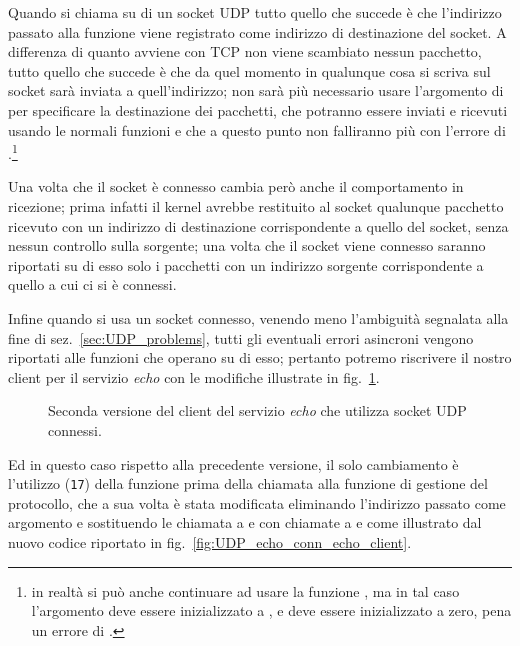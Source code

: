 Quando si chiama  su di un socket UDP tutto quello che succede è
che l'indirizzo passato alla funzione viene registrato come indirizzo di
destinazione del socket. A differenza di quanto avviene con TCP non viene
scambiato nessun pacchetto, tutto quello che succede è che da quel momento in
qualunque cosa si scriva sul socket sarà inviata a quell'indirizzo; non sarà
più necessario usare l'argomento  di  per specificare
la destinazione dei pacchetti, che potranno essere inviati e ricevuti usando
le normali funzioni  e  che a questo punto non
falliranno più con l'errore di .\footnote{in realtà si
  può anche continuare ad usare la funzione , ma in tal caso
  l'argomento  deve essere inizializzato a , e
   deve essere inizializzato a zero, pena un errore di
  .}

Una volta che il socket è connesso cambia però anche il comportamento in
ricezione; prima infatti il kernel avrebbe restituito al socket qualunque
pacchetto ricevuto con un indirizzo di destinazione corrispondente a quello
del socket, senza nessun controllo sulla sorgente; una volta che il socket
viene connesso saranno riportati su di esso solo i pacchetti con un indirizzo
sorgente corrispondente a quello a cui ci si è connessi.

Infine quando si usa un socket connesso, venendo meno l'ambiguità segnalata
alla fine di sez.~\ref{sec:UDP_problems}, tutti gli eventuali errori asincroni
vengono riportati alle funzioni che operano su di esso; pertanto potremo
riscrivere il nostro client per il servizio \textit{echo} con le modifiche
illustrate in fig.~\ref{fig:UDP_echo_conn_cli}.

\begin{figure}[!htbp] 
  \footnotesize \centering
  \begin{minipage}[c]{\codesamplewidth}
  \end{minipage}
  \normalsize
  \caption{Seconda versione del client del servizio \textit{echo} che utilizza
    socket UDP connessi.}
  \label{fig:UDP_echo_conn_cli}
\end{figure}

Ed in questo caso rispetto alla precedente versione, il solo cambiamento è
l'utilizzo (\texttt{\small 17}) della funzione  prima della
chiamata alla funzione di gestione del protocollo, che a sua volta è stata
modificata eliminando l'indirizzo passato come argomento e sostituendo le
chiamata a  e  con chiamate a  e
 come illustrato dal nuovo codice riportato in
fig.~\ref{fig:UDP_echo_conn_echo_client}.

